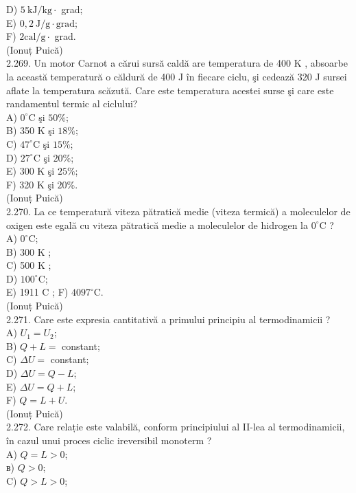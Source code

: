 \documentclass[10pt]{article}
\begin{document}
D) $5 \mathrm{~kJ} / \mathrm{kg} \cdot$ grad;\\
E) $0,2 \mathrm{~J} / \mathrm{g} \cdot \mathrm{grad}$;\\
F) $2 \mathrm{cal} / \mathrm{g} \cdot$ grad.\\
(Ionuț Puică)\\
2.269. Un motor Carnot a cărui sursă caldă are temperatura de 400 K , absoarbe la această temperatură o căldură de 400 J în fiecare ciclu, şi cedează 320 J sursei aflate la temperatura scăzută. Care este temperatura acestei surse şi care este randamentul termic al ciclului?\\
A) $0^{\circ} \mathrm{C}$ şi $50 \%$;\\
B) 350 K şi $18 \%$;\\
C) $47^{\circ} \mathrm{C}$ şi $15 \%$;\\
D) $27^{\circ} \mathrm{C}$ şi $20 \%$;\\
E) 300 K şi $25 \%$;\\
F) 320 K şi $20 \%$.\\
(Ionuț Puică)\\
2.270. La ce temperatură viteza pătratică medie (viteza termică) a moleculelor de oxigen este egală cu viteza pătratică medie a moleculelor de hidrogen la $0^{\circ} \mathrm{C}$ ?\\
A) $0^{\circ} \mathrm{C}$;\\
B) 300 K ;\\
C) 500 K ;\\
D) $100^{\circ} \mathrm{C}$;\\
E) 1911 C ; F) $4097^{\circ} \mathrm{C}$.\\
(Ionuț Puică)\\
2.271. Care este expresia cantitativă a primului principiu al termodinamicii ?\\
A) $U_{1}=U_{2}$;\\
B) $Q+L=$ constant;\\
C) $\Delta U=$ constant;\\
D) $\Delta U=Q-L$;\\
E) $\Delta U=Q+L$;\\
F) $Q=L+U$.\\
(Ionuț Puică)\\
2.272. Care relație este valabilă, conform principiului al II-lea al termodinamicii, în cazul unui proces ciclic ireversibil monoterm ?\\
A) $Q=L>0$;\\
в) $Q>0$;\\
C) $Q>L>0$;\\
\end{document}
